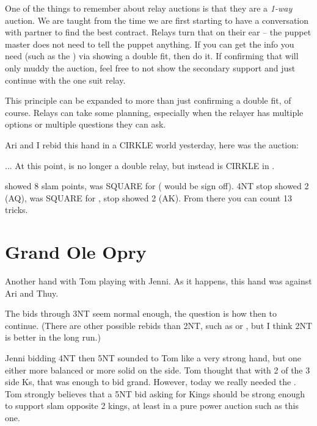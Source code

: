 \documentclass[tom-ari]{subfile}
\begin{document}
	One of the things to remember about relay auctions is that they are a \emph{1-way} auction. We are taught from the time we are first starting to have a conversation with partner to find the best contract. Relays turn that on their ear -- the puppet master does not need to tell the puppet anything.  If you can get the info you need (such as the ) via showing a double fit, then do it.  If confirming that will only muddy the auction, feel free to not show the secondary support and just continue with the one suit relay.
	
	This principle can be expanded to more than just confirming a double fit, of course. Relays can take some planning, especially when the relayer has multiple options or multiple questions they can ask.
	

	Ari and I rebid this hand in a CIRKLE world yesterday, here was the auction:
	
	
	... At this point,  is no longer a double relay, but instead is CIRKLE in \heartsuit.
	
	
	 showed 8 slam points,  was SQUARE for \heartsuit ( would be sign off). 4NT stop showed 2 (AQ),  was SQUARE for \clubsuit,  stop showed 2 (AK).  From there you can count 13 tricks.
	
	\section{Grand Ole Opry}
	 
	
	Another hand with Tom playing with Jenni. As it happens, this hand was against Ari and Thuy. 
	
	The bids through 3NT seem normal enough, the question is how then to continue.  (There are other possible rebids than 2NT, such as  or , but I think 2NT is better in the long run.)
	
	Jenni bidding 4NT then 5NT sounded to Tom like a very strong hand, but one either more balanced or more solid on the side. Tom thought that with 2 of the 3 side Ks, that was enough to bid grand.  However, today we really needed the . Tom strongly believes that a 5NT bid asking for Kings should be strong enough to support slam opposite 2 kings, at least in a pure power auction such as this one.
	
\end{document}
